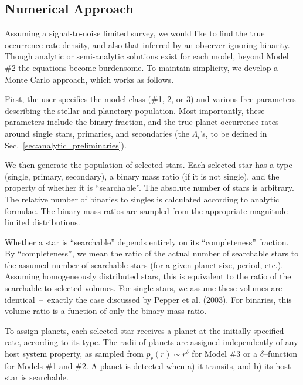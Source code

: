 \subsection{Numerical Approach}
\label{sec:numerical_methods}

Assuming a signal-to-noise limited survey, we would like to find the true
occurrence rate density, and also that inferred by an observer ignoring 
binarity.
Though analytic or semi-analytic solutions exist for each model, beyond Model 
\#2 the equations become burdensome. To maintain simplicity, we develop a 
Monte Carlo approach, which works as follows.

First, the user specifies the model class (\#1, 2, or 3) and various free 
parameters describing the stellar and planetary population.
Most importantly, these parameters include the binary fraction, and the true 
planet occurrence rates around single stars, primaries, and secondaries (the 
$\Lambda_i$'s, to be defined in Sec.~\ref{sec:analytic_preliminaries}).
                                                               
We then generate the population of selected stars.
Each selected star has a type (single, primary, secondary), 
a binary mass ratio (if it is not single), and the property of whether it 
is ``searchable''.               
The absolute number of stars is arbitrary.
The relative number of binaries to singles is calculated according to analytic
formulae. The binary mass ratios are sampled from the
appropriate magnitude-limited distributions.

Whether a star is ``searchable'' depends entirely on its ``completeness''
fraction. By ``completeness'', we mean the ratio of the actual number of 
searchable stars to the assumed number of searchable stars (for a given planet 
size, period, etc.).
Assuming homogeneously distributed stars, this is equivalent to the
ratio of the searchable to selected volumes.
For single stars, we assume these volumes are identical~--~exactly the case 
discussed by Pepper et al. (2003).
For binaries, this volume ratio is a function of only the binary mass ratio.

To assign planets, each selected star receives a planet at the initially 
specified rate, according to its type.
The radii of planets are assigned independently of any host system
property, as sampled from $p_r(r) \sim r^\delta$ for Model \#3 or a 
$\delta$--function 
for Models \#1 and \#2.
A planet is detected when a) it transits, and b) its host star is
searchable.


